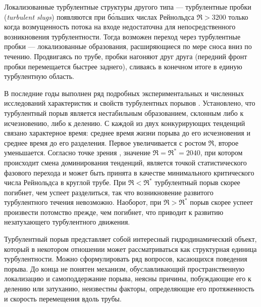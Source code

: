 Локализованные турбулентные структуры другого типа --- турбулентные пробки ({\it turbulent slugs}) появляются при б\'{о}льших числах Рейнольдса $\Re>3200$ только когда возмущенность потока на входе недостаточна для непосредственного возникновения турбулентности. Тогда возможен переход через турбулентные пробки --- локализованные образования, расширяющиеся по мере сноса вниз по течению. Продвигаясь по трубе, пробки нагоняют друг друга (передний фронт пробки перемещается быстрее заднего), сливаясь в конечном итоге в единую турбулентную область.

В последние годы выполнен ряд подробных экспериментальных и численных исследований характеристик и свойств турбулентных порывов \cite{Priymak2004, Peixinho2006, Hof2006finite, Willis2007, Hof2008, Kuik2010, Avila2011}. Установлено, что турбулентный порыв является нестабильным образованием, склонным либо к исчезновению, либо к делению. С каждой из двух конкурирующих тенденций связано характерное время: среднее время жизни порыва до его исчезновения и среднее время до его разделения. Первое увеличивается с ростом $\Re$, второе уменьшается. Согласно точке зрения \cite{Avila2011}, значение $\Re=\Re^*=2040$, при котором происходит смена доминирования тенденций, является точкой статистического фазового перехода и может быть принята в качестве минимального критического числа Рейнольдса в круглой трубе. При $\Re<\Re^*$ турбулентный порыв скорее погибнет, чем успеет разделиться, так что возникновение развитого турбулентного течения невозможно. Наоборот, при $\Re>\Re^*$ порыв скорее успеет произвести потомство прежде, чем погибнет, что приводит к развитию незатухающего турбулентного движения.

Турбулентный порыв представляет собой интересный гидродинамический объект, который в некотором отношении может рассматриваться как структурная единица турбулентности. Можно сформулировать ряд вопросов, касающихся поведения порыва. До конца не понятен механизм, обуславливающий пространственную локализацию и самоподдержание порыва, неясны причины, побуждающие его к делению или затуханию, неизвестны факторы, определяющие его протяженность и скорость перемещения вдоль трубы.

